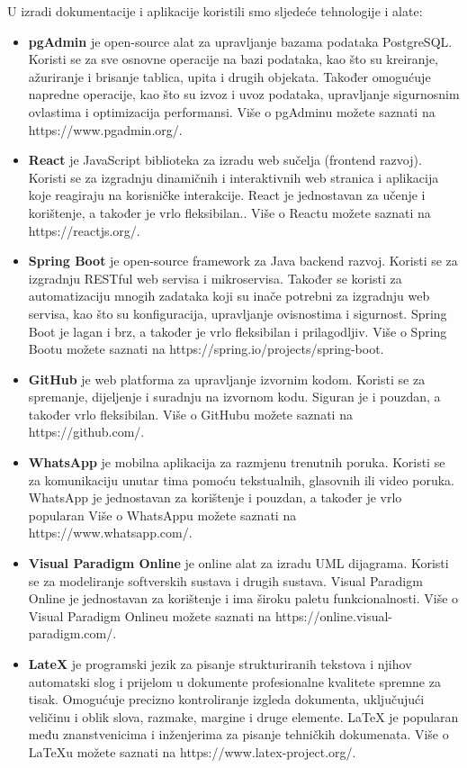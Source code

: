 			U izradi dokumentacije i aplikacije koristili smo sljedeće tehnologije i alate:
			\begin{itemize}
			\item\textbf{pgAdmin} je open-source alat za upravljanje bazama podataka PostgreSQL. Koristi se za sve osnovne operacije na bazi podataka, kao što su kreiranje, ažuriranje i brisanje tablica, upita i drugih objekata. Također omogućuje napredne operacije, kao što su izvoz i uvoz podataka, upravljanje sigurnosnim ovlastima i optimizacija performansi. Više o pgAdminu možete saznati na https://www.pgadmin.org/.
			
			\item\textbf{React} je JavaScript biblioteka za izradu web sučelja (frontend razvoj). Koristi se za izgradnju dinamičnih i interaktivnih web stranica i aplikacija koje reagiraju na korisničke interakcije. React je jednostavan za učenje i korištenje, a također je vrlo fleksibilan.. Više o Reactu možete saznati na https://reactjs.org/.
			
			\item\textbf{Spring Boot} je open-source framework za Java backend razvoj. Koristi se za izgradnju RESTful web servisa i mikroservisa. Također se koristi za automatizaciju mnogih zadataka koji su inače potrebni za izgradnju web servisa, kao što su konfiguracija, upravljanje ovisnostima i sigurnost. Spring Boot je lagan i brz, a također je vrlo fleksibilan i prilagodljiv. Više o Spring Bootu možete saznati na https://spring.io/projects/spring-boot.
			
			\item\textbf{GitHub} je web platforma za upravljanje izvornim kodom. Koristi se za spremanje, dijeljenje i suradnju na izvornom kodu. Siguran je i pouzdan, a također vrlo fleksibilan.  Više o GitHubu možete saznati na https://github.com/.
			
			\item\textbf{WhatsApp} je mobilna aplikacija za razmjenu trenutnih poruka. Koristi se za komunikaciju unutar tima pomoću tekstualnih, glasovnih ili video poruka. WhatsApp je jednostavan za korištenje i pouzdan, a također je vrlo popularan Više o WhatsAppu možete saznati na https://www.whatsapp.com/.
			
			\item\textbf{Visual Paradigm Online} je online alat za izradu UML dijagrama. Koristi se za modeliranje softverskih sustava i drugih sustava. Visual Paradigm Online je jednostavan za korištenje i ima široku paletu funkcionalnosti. Više o Visual Paradigm Onlineu možete saznati na https://online.visual-paradigm.com/.
			
			\item\textbf{LateX} je programski jezik za pisanje strukturiranih tekstova i njihov automatski slog i prijelom u dokumente profesionalne kvalitete spremne za tisak. Omogućuje precizno kontroliranje izgleda dokumenta, uključujući veličinu i oblik slova, razmake, margine i druge elemente. LaTeX je popularan među znanstvenicima i inženjerima za pisanje tehničkih dokumenata. Više o LaTeXu možete saznati na https://www.latex-project.org/.
			\end{itemize}
			
